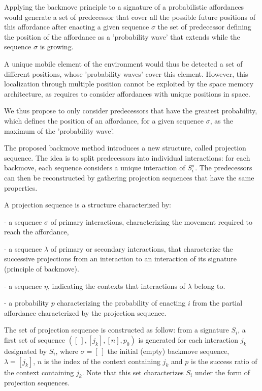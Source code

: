\documentclass[conference]{IEEEtran}
\begin{document}
Applying the backmove principle to a signature of a probabilistic affordances would generate a set of predecessor that cover all the possible future positions of this affordance after enacting a given sequence $\sigma$ the set of predecessor defining the position of the affordance as a 'probability wave' that extends while the sequence $\sigma$ is growing.

A unique mobile element of the environment would thus be detected a set of different positions, whose 'probability waves' cover this element. However, this localization through multiple position cannot be exploited by the space memory architecture, as requires to consider affordances with unique positions in space.

We thus propose to only consider predecessors that have the greatest probability, which defines the position of an affordance, for a given sequence $\sigma$, as the maximum of the 'probability wave'. 

The proposed backmove method introduces a new structure, called projection sequence. The idea is to split predecessors into individual interactions: for each backmove, each sequence considers a unique interaction of $S_i^{\sigma}$. The predecessors can then be reconstructed by gathering projection sequences that have the same properties. %

A projection sequence is a structure characterized by:

- a sequence $\sigma$ of primary interactions, characterizing the movement required to reach the affordance,

- a sequence $\lambda$ of primary or secondary interactions, that characterize the successive projections from an interaction to an interaction of its signature (principle of backmove).

- a sequence $\eta$, indicating the contexts that interactions of $\lambda$ belong to.

- a probability $p$ characterizing the probability of enacting $i$ from the partial affordance characterized by the projection sequence.


The set of projection sequence is constructed as follow: from a signature $S_i$, a first set of sequence $([\:], [j_k], [n], p_0)$ is generated for each interaction $j_k$ designated by $S_i$, where $\sigma=[\: ]$ the initial (empty) backmove sequence, $\lambda=[j_k]$, $n$ is the index of the context containing $j_k$ and $p$ is the success ratio of the context containing $j_k$. Note that this set characterizes $S_i$ under the form of projection sequences.
\end{document}

